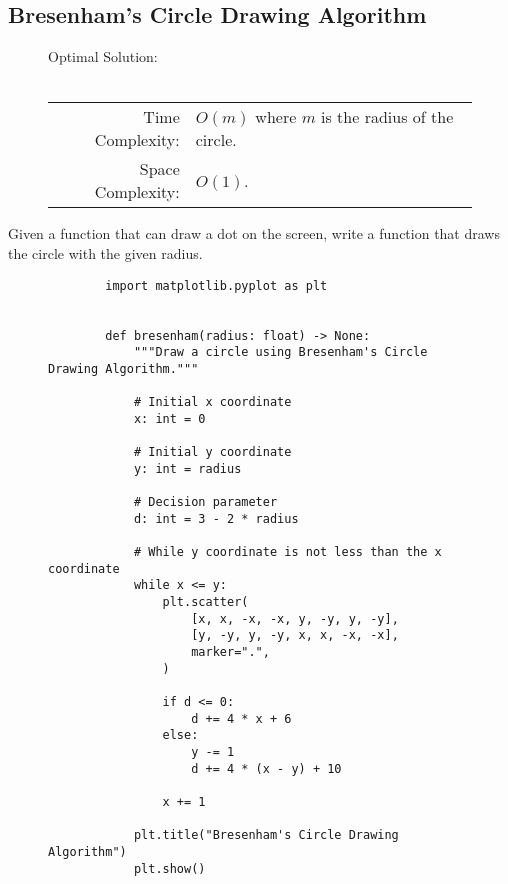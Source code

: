 
\subsection{Bresenham's Circle Drawing Algorithm}

\begin{figure}[H]
    Optimal Solution:\\\\
    \begin{tabular}{rl}
        Time Complexity:& \(O(m)\) where \(m\) is the radius of the circle.\\
        Space Complexity:& \(O(1)\).
    \end{tabular}
\end{figure}

Given a function that can draw a dot on the screen, write a function that draws
the circle with the given radius.

\begin{figure}[H]
    \centering
    \begin{verbatim}
        import matplotlib.pyplot as plt


        def bresenham(radius: float) -> None:
            """Draw a circle using Bresenham's Circle Drawing Algorithm."""

            # Initial x coordinate
            x: int = 0

            # Initial y coordinate
            y: int = radius

            # Decision parameter
            d: int = 3 - 2 * radius

            # While y coordinate is not less than the x coordinate
            while x <= y:
                plt.scatter(
                    [x, x, -x, -x, y, -y, y, -y],
                    [y, -y, y, -y, x, x, -x, -x],
                    marker=".",
                )

                if d <= 0:
                    d += 4 * x + 6
                else:
                    y -= 1
                    d += 4 * (x - y) + 10

                x += 1

            plt.title("Bresenham's Circle Drawing Algorithm")
            plt.show()
    \end{verbatim}
\end{figure}
